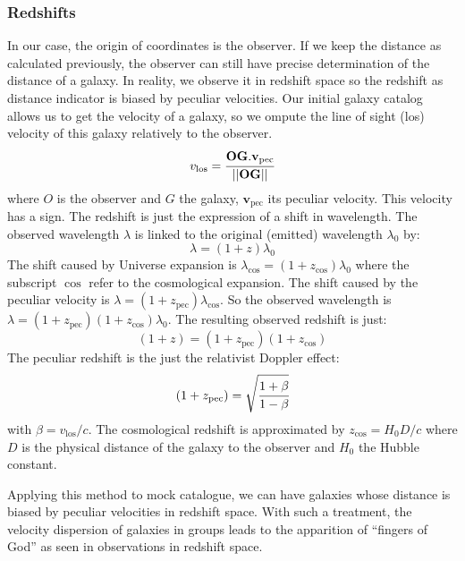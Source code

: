 \subsubsection{Redshifts}

In our case, the origin of coordinates is the observer. If we keep the distance
as calculated previously, the observer can still have precise determination of
the distance of a galaxy. In reality, we observe it in redshift space so the
redshift as distance indicator is biased by peculiar velocities. Our initial
galaxy catalog allows us to get the velocity of a galaxy, so we ompute the line
of sight (los) velocity of this galaxy relatively to the observer.
%
\begin{equation}
v_\mathrm{los}=\cfrac{\textbf{OG}.\textbf{v}_\mathrm{pec}}
    {\left|\left|\textbf{OG}\right|\right|}
\end{equation}
%
where $O$ is the observer and $G$ the galaxy, $\textbf{v}_{\mathrm{pec}}$ its
peculiar velocity. This velocity has a sign. The redshift is just the
expression of a shift in wavelength. The observed wavelength $\lambda$ is
linked to the original (emitted) wavelength $\lambda_0$ by:
%
\begin{equation}
    \lambda=(1+z)\lambda_0
\end{equation}
%
The shift caused by Universe expansion is
$\lambda_{\cos}=(1+z_{\cos})\lambda_0$ where the subscript $\cos$ refer to the
cosmological expansion. The shift caused by the peculiar velocity is
$\lambda=(1+z_{\mathrm{pec}})\lambda_{\cos}$. So the observed wavelength is
$\lambda=(1+z_{\mathrm{pec}})(1+z_{\cos})\lambda_0$. The resulting observed
redshift is just:
%
\begin{equation}
    (1+z)=(1+z_{\mathrm{pec}})(1+z_{\cos})
\end{equation}
%
The peculiar redshift is the just the relativist Doppler effect:
%
\begin{equation}
    (1+z_{\mathrm{pec}})=\sqrt{\cfrac{1+\beta}{1-\beta}}
\end{equation}
%
with $\beta={v_{\mathrm{los}}}/{c}$. The cosmological redshift is
approximated by $z_{\cos}={H_0}{D}/c$ where $D$ is the physical distance of
the galaxy to the observer and $H_0$ the Hubble constant.
%

Applying this method to mock catalogue, we can have galaxies whose distance
is biased by peculiar velocities in redshift space. With such a treatment,
the velocity dispersion of galaxies in groups leads to the apparition of
``fingers of God'' as seen in observations in redshift space.

